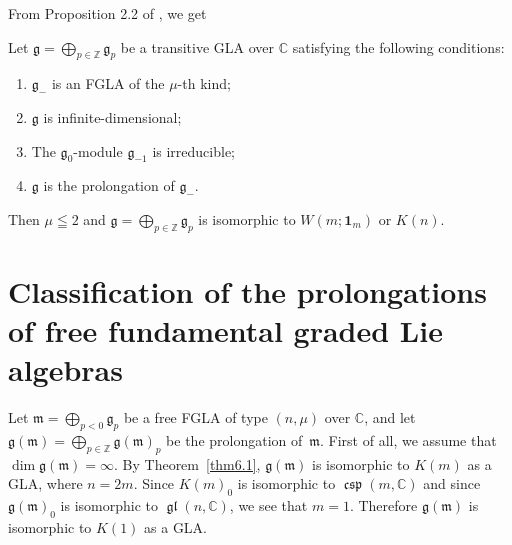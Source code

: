 \documentclass[pdftex]{sigma}
\numberwithin{equation}{section}
\numberwithin{theorem}{section}
\numberwithin{proposition}{section}
\numberwithin{lemma}{section}
\numberwithin{corollary}{section}
\numberwithin{definition}{section}
\numberwithin{example}{section}
\numberwithin{remark}{section}
\numberwithin{note}{section}
\newcommand{\gl}{\operatorname{\mathfrak{gl}}}
\newcommand{\csp}{\operatorname{\mathfrak{csp}}}
\newcommand{\gla}[1]{\mathfrak#1=\bigoplus\limits_{p\in\mathbb Z}\mathfrak#1_p} \renewcommand{\labelenumi}{{\rm (\arabic{enumi})}}
\begin{document}
From Proposition 2.2 of \cite{mt70:1}, we get
\begin{theorem}\label{thm6.1} Let $\gla g$ be a transitive GLA over $\mathbb C$
satisfying the following conditions:
\begin{enumerate}\itemsep=0pt
\renewcommand{\labelenumi}{$(\roman{enumi})$}
\item $\mathfrak g_-$ is an FGLA of the
$\mu$-th kind;
\item $\mathfrak g$ is infinite-dimensional;
\item The $\mathfrak g_0$-module $\mathfrak g_{-1}$ is irreducible;
\item $\mathfrak g$ is the prolongation of $\mathfrak g_-$.
\end{enumerate}
Then $\mu\leqq2$ and $\gla g$ is isomorphic to $W(m;{\bm 1}_m)$ or $K(n)$.
\end{theorem}

\section{Classif\/ication of the prolongations\\ of free
fundamental graded Lie algebras}\label{section7}

Let $\mathfrak m=\bigoplus\limits_{p<0}\mathfrak g_p$ be a free FGLA of type
$(n,\mu)$ over $\mathbb C$, and let $\mathfrak g(\mathfrak m)
=\bigoplus\limits_{p\in\mathbb Z}\mathfrak g(\mathfrak m)_p$ be the
prolongation of~$\mathfrak m$.
First of all, we assume that $\dim \mathfrak g(\mathfrak m)=\infty$.
By Theorem~\ref{thm6.1},
$\mathfrak g(\mathfrak m)$ is isomorphic to $K(m)$
as a GLA, where $n=2m$.
Since $K(m)_0$ is isomorphic to $\csp(m,\mathbb C)$ and since
$\mathfrak g(\mathfrak m)_0$ is isomorphic to $\gl(n,\mathbb C)$,
we see that $m=1$.
Therefore $\mathfrak g(\mathfrak m)$ is isomorphic to
$K(1)$ as a GLA.
\end{document}
